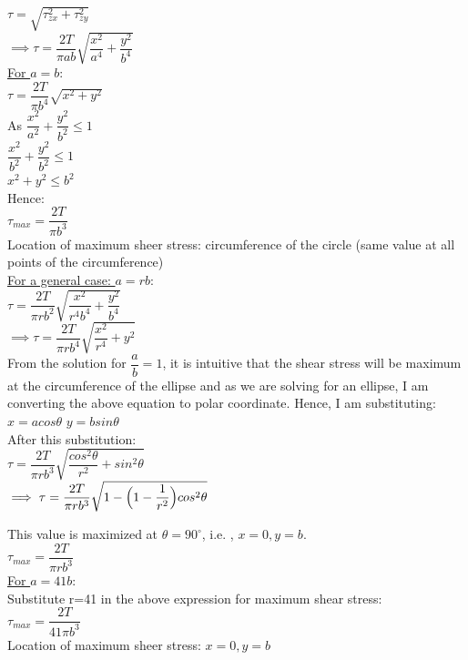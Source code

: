 \documentclass{article}
\begin{document}
$\tau=\sqrt{\tau_{zx}^2+\tau_{zy}^2}$\\
$\implies \tau= \dfrac{2T}{\pi ab}\sqrt{\dfrac{x^2}{a^4}+ \dfrac{y^2}{b^4}}$\\

\noindent \underline{For $a=b$}: \\
$\tau= \dfrac{2T}{\pi b^4}\sqrt{x^2+y^2}$\\

\noindent As $\dfrac{x^2}{a^2}+\dfrac{y^2}{b^2}\leq 1$ \\
$\dfrac{x^2}{b^2}+\dfrac{y^2}{b^2}\leq 1$\\
$x^2+y^2\leq b^2$\\

\noindent Hence: \\

\noindent $\tau_{max}= \dfrac{2T}{\pi b^3}$\\

\noindent Location of maximum sheer stress: circumference of the circle (same value at all points of the circumference)\\

\noindent \underline{For a general case: $a=rb$}: \\
$\tau= \dfrac{2T}{\pi rb^2}\sqrt{\dfrac{x^2}{r^4b^4}+ \dfrac{y^2}{b^4}}$\\
$\implies \tau= \dfrac{2T}{\pi rb^4}\sqrt{\dfrac{x^2}{r^4}+ y^2}$\\
\bigbreak
\noindent From the solution for $\dfrac{a}{b}=1$, it is intuitive that the shear stress will be maximum at the circumference of the ellipse and as we are solving for an ellipse, I am converting the above equation to polar coordinate. Hence, I am substituting:\\ $x=acos\theta$ $y=bsin\theta$\\

\noindent After this substitution: \\

\noindent $\tau= \dfrac{2T}{\pi rb^3}\sqrt{\dfrac{cos^2\theta}{r^2}+ sin^2\theta}$\\
$\implies \tau= \dfrac{2T}{\pi rb^3}\sqrt{1-\Big{(}1-\dfrac{1}{r^2}\Big{)}cos^2\theta} $

\noindent This value is maximized at $\theta=90^\circ$, i.e. , $x=0, y=b$. \\

\noindent $\tau_{max}=\dfrac{2T}{\pi rb^3}$\\

\noindent \underline{For $a=41b$}:\\

\noindent Substitute r=41 in the above expression for maximum shear stress: \\

\noindent $\tau_{max}=\dfrac{2T}{41\pi b^3}$\\

\noindent Location of maximum sheer stress: $x=0, y=b$\\
\end{document}
